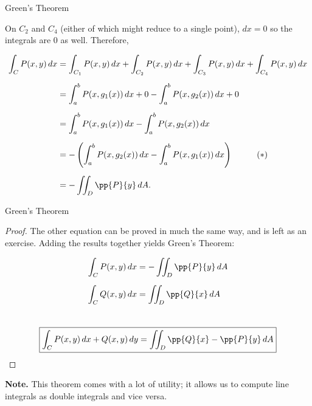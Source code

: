 \documentclass[11pt,english,
handout
]{beamer}
\begin{document}
\begin{frame}[t]{Green's Theorem}
\small
\begin{proofs}

On $C_2$ and $C_4$ (either of which might reduce to a single point), $dx=0$ so the integrals are 0 as well. \pause Therefore,

{\footnotesize
\begin{align*}
\int_CP(x,y)\,dx&=\int_{C_1}P(x,y)\,dx+\int_{C_2}P(x,y)\,dx+\int_{C_3}P(x,y)\,dx+\int_{C_4}P(x,y)\,dx\\[2mm]
&=\int_a^bP(x,g_1(x))\,dx+0 -\int_a^bP(x,g_2(x))\,dx+0\\[2mm]
&=\int_a^bP(x,g_1(x))\,dx -\int_a^bP(x,g_2(x))\,dx\\[2mm]
&=-\left(\int_a^bP(x,g_2(x))\,dx-\int_a^bP(x,g_1(x))\,dx\right)\hspace{10mm}(*)\\[2mm]
&=-\iint_D\pp{P}{y}\,dA.
\end{align*}}
\end{proofs}
\end{frame}













\begin{frame}[t]{Green's Theorem}
\small
\begin{proof}

The other equation can be proved in much the same way, and is left as an exercise. \pause Adding the results together yields Green's Theorem:

\begin{align*}
\int_CP(x,y)\,dx&=-\iint_D\pp{P}{y}\,dA\\[2mm]
\int_CQ(x,y)\,dx&=\iint_D\pp{Q}{x}\,dA\\[7mm]
\end{align*}
\vspace{-15mm}
\[
\boxed{\int_CP(x,y)\,dx+Q(x,y)\,dy=\iint_D\pp{Q}{x}-\pp{P}{y}\,dA}\qedhere
\]
\end{proof}
\vspace{3mm}
\textbf{Note.} This theorem comes with a lot of utility; it allows us to compute line integrals as double integrals and vice versa.
\end{frame}
\end{document}
